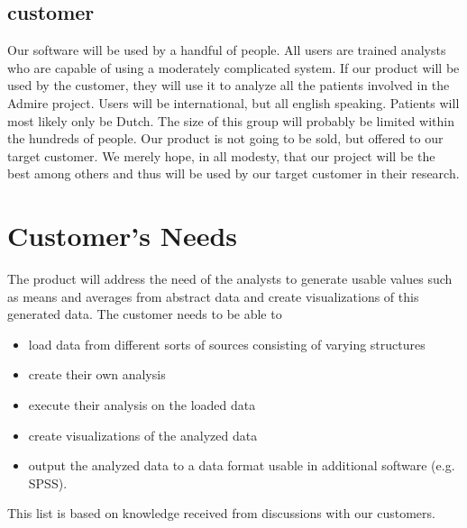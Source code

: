 \documentclass[a4paper]{article}
\begin{document}
\subsection{customer}
Our software will be used by a handful of people. All users are trained analysts who are capable of using a moderately complicated system. If our product will be used by the customer, they will use it to analyze all the patients involved in the Admire project. Users will be international, but all english speaking. Patients will most likely only be Dutch. The size of this group will probably be limited within the hundreds of people. Our product is not going to be sold, but offered to our target customer. We merely hope, in all modesty, that our project will be the best among others and thus will be used by our target customer in their research. 

\section{Customer's Needs}
The product will address the need of the analysts to generate usable values such as means and averages from abstract data and create visualizations of this generated data. The customer needs to be able to 
\begin{itemize}
\item load data from different sorts of sources consisting of varying structures 
\item create their own analysis 
\item execute their analysis on the loaded data
\item create visualizations of the analyzed data
\item output the analyzed data to a data format usable in additional software (e.g. SPSS).
\end{itemize}
This list is based on knowledge received from discussions with our customers. 
\end{document}
